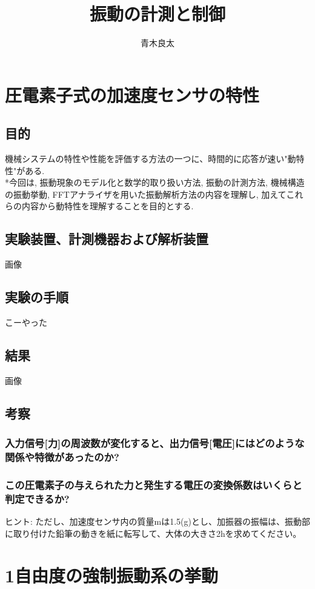 \documentclass{jsarticle}
\begin{document}
\title{振動の計測と制御}
\author{青木良太}
\maketitle


\section{圧電素子式の加速度センサの特性}
\subsection{目的}
機械システムの特性や性能を評価する方法の一つに、時間的に応答が速い"動特性"がある.　\\*今回は, 振動現象のモデル化と数学的取り扱い方法, 振動の計測方法, 機械構造の振動挙動, FFTアナライザを用いた振動解析方法の内容を理解し, 加えてこれらの内容から動特性を理解することを目的とする. 
\subsection{実験装置、計測機器および解析装置}
画像
\subsection{実験の手順}
こーやった
\subsection{結果}
画像
\subsection{考察}
\subsubsection{入力信号[力]の周波数が変化すると、出力信号[電圧]にはどのような関係や特徴があったのか? }
\subsubsection{この圧電素子の与えられた力と発生する電圧の変換係数はいくらと判定できるか? }
ヒント: ただし、加速度センサ内の質量mは1.5(g)とし、加振器の振幅は、振動部に取り付けた鉛筆の動きを紙に転写して、大体の大きさ2hを求めてください。

\section{1自由度の強制振動系の挙動 }
\end{document}
